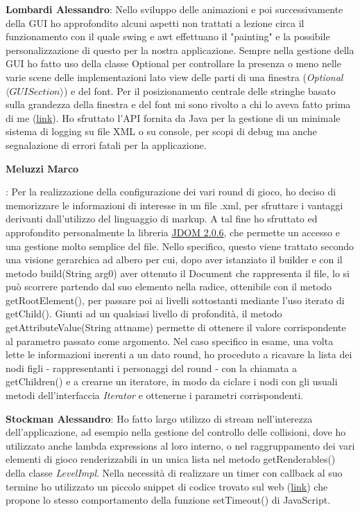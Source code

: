 \documentclass[a4paper,12pt, hidelinks]{report}
\begin{document}
	\item \textbf{Lombardi Alessandro}: Nello sviluppo delle animazioni e poi successivamente della GUI ho approfondito alcuni aspetti non trattati a lezione circa il funzionamento con il quale swing e awt effettuano il "painting" e la possibile personalizzazione di questo per la nostra applicazione. Sempre nella gestione della GUI ho fatto uso della classe Optional per controllare la presenza o meno nelle varie scene delle implementazioni lato view delle parti di una finestra (\emph{Optional$\langle GUISection \rangle$}) e del font. Per il posizionamento centrale delle stringhe basato sulla grandezza della finestra e del font mi sono rivolto a chi lo aveva fatto prima di me (\href{https://stackoverflow.com/questions/27706197/how-can-i-center-graphics-drawstring-in-java}{link}). Ho sfruttato l'API fornita da Java per la gestione di un minimale sistema di logging su file XML o su console, per scopi di debug ma anche segnalazione di errori  fatali per la applicazione.

	\hypertarget{target}{\item \textbf{Meluzzi Marco}}: Per la realizzazione della configurazione dei vari round di gioco, ho deciso di memorizzare le informazioni di interesse in un file .xml, per sfruttare i vantaggi derivanti dall'utilizzo del linguaggio di markup. A tal fine ho sfruttato ed approfondito personalmente la libreria \href{http://www.jdom.org}{JDOM 2.0.6}, che permette un accesso e una gestione molto semplice del file. Nello specifico, questo viene trattato secondo una visione gerarchica ad albero per cui, dopo aver istanziato il builder e con il metodo build(String arg0) aver ottenuto il Document che rappresenta il file, lo si può scorrere partendo dal suo elemento nella radice, ottenibile con il metodo getRootElement(), per passare poi ai livelli sottostanti mediante l'uso iterato di getChild(). Giunti ad un qualsiasi livello di profondità, il metodo getAttributeValue(String attname) permette di ottenere il valore corrispondente al parametro passato come argomento. Nel caso specifico in esame, una volta lette le informazioni inerenti a un dato round, ho proceduto a ricavare la lista dei nodi figli - rappresentanti i personaggi del round - con la chiamata a getChildren() e a crearne un iteratore, in modo da ciclare i nodi con gli usuali metodi dell'interfaccia \emph{Iterator} e ottenerne i parametri corrispondenti.

	\item \textbf{Stockman Alessandro}: Ho fatto largo utilizzo di stream nell'interezza dell'applicazione, ad esempio nella gestione del controllo delle collisioni, dove ho utilizzato anche lambda expressions al loro interno, o nel raggruppamento dei vari elementi di gioco renderizzabili in un unica lista nel metodo getRenderables() della classe \emph{LevelImpl}.
	Nella necessità di realizzare un timer con callback al suo termine ho utilizzato un piccolo snippet di codice trovato sul web (\href{https://stackoverflow.com/questions/26311470/what-is-the-equivalent-of-javascript-settimeout-in-java}{link}) che propone lo stesso comportamento della funzione setTimeout() di JavaScript.
\end{document}

